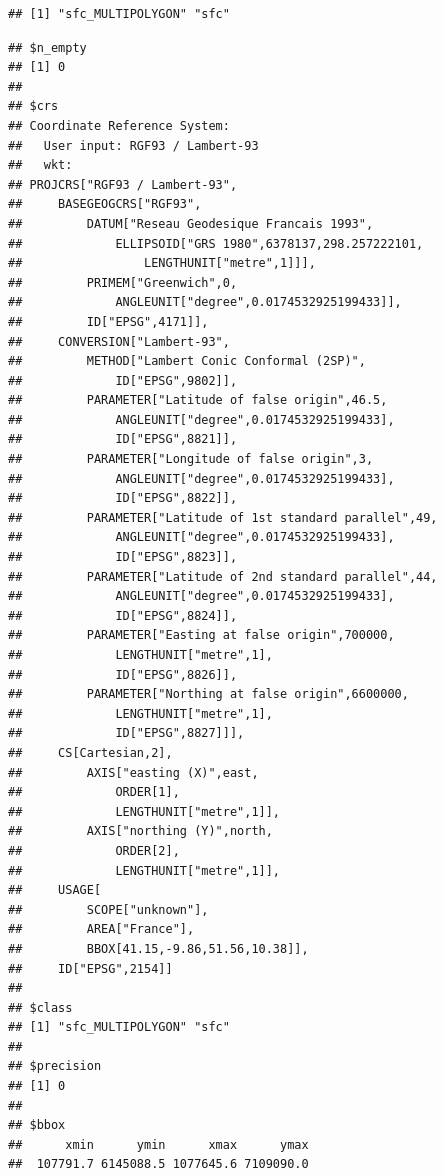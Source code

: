 \documentclass[
  french,
]{book}
\newenvironment{Shaded}{\begin{snugshade}}{\end{snugshade}}
\newcommand{\KeywordTok}[1]{\textcolor[rgb]{0.13,0.29,0.53}{\textbf{#1}}}
\newcommand{\NormalTok}[1]{#1}
\newcommand{\OperatorTok}[1]{\textcolor[rgb]{0.81,0.36,0.00}{\textbf{#1}}}
\begin{document}
\begin{Shaded}
\end{Shaded}

\begin{verbatim}
## [1] "sfc_MULTIPOLYGON" "sfc"
\end{verbatim}

\begin{Shaded}
\end{Shaded}

\begin{verbatim}
## $n_empty
## [1] 0
## 
## $crs
## Coordinate Reference System:
##   User input: RGF93 / Lambert-93 
##   wkt:
## PROJCRS["RGF93 / Lambert-93",
##     BASEGEOGCRS["RGF93",
##         DATUM["Reseau Geodesique Francais 1993",
##             ELLIPSOID["GRS 1980",6378137,298.257222101,
##                 LENGTHUNIT["metre",1]]],
##         PRIMEM["Greenwich",0,
##             ANGLEUNIT["degree",0.0174532925199433]],
##         ID["EPSG",4171]],
##     CONVERSION["Lambert-93",
##         METHOD["Lambert Conic Conformal (2SP)",
##             ID["EPSG",9802]],
##         PARAMETER["Latitude of false origin",46.5,
##             ANGLEUNIT["degree",0.0174532925199433],
##             ID["EPSG",8821]],
##         PARAMETER["Longitude of false origin",3,
##             ANGLEUNIT["degree",0.0174532925199433],
##             ID["EPSG",8822]],
##         PARAMETER["Latitude of 1st standard parallel",49,
##             ANGLEUNIT["degree",0.0174532925199433],
##             ID["EPSG",8823]],
##         PARAMETER["Latitude of 2nd standard parallel",44,
##             ANGLEUNIT["degree",0.0174532925199433],
##             ID["EPSG",8824]],
##         PARAMETER["Easting at false origin",700000,
##             LENGTHUNIT["metre",1],
##             ID["EPSG",8826]],
##         PARAMETER["Northing at false origin",6600000,
##             LENGTHUNIT["metre",1],
##             ID["EPSG",8827]]],
##     CS[Cartesian,2],
##         AXIS["easting (X)",east,
##             ORDER[1],
##             LENGTHUNIT["metre",1]],
##         AXIS["northing (Y)",north,
##             ORDER[2],
##             LENGTHUNIT["metre",1]],
##     USAGE[
##         SCOPE["unknown"],
##         AREA["France"],
##         BBOX[41.15,-9.86,51.56,10.38]],
##     ID["EPSG",2154]]
## 
## $class
## [1] "sfc_MULTIPOLYGON" "sfc"             
## 
## $precision
## [1] 0
## 
## $bbox
##      xmin      ymin      xmax      ymax 
##  107791.7 6145088.5 1077645.6 7109090.0
\end{verbatim}
\end{document}
